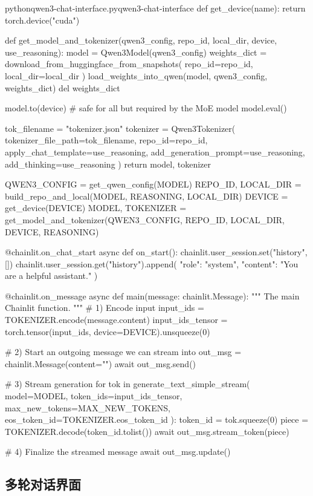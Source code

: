 \documentclass[lang=cn,newtx,10pt,scheme=chinese]{elegantbook}
\begin{document}
\begin{codebox}{python}{qwen3-chat-interface.py}{qwen3-chat-interface}
def get_device(name):
    return torch.device("cuda")

def get_model_and_tokenizer(qwen3_config, repo_id, local_dir, device, use_reasoning):
    model = Qwen3Model(qwen3_config)
    weights_dict = download_from_huggingface_from_snapshots(
        repo_id=repo_id,
        local_dir=local_dir
    )
    load_weights_into_qwen(model, qwen3_config, weights_dict)
    del weights_dict

    model.to(device)  # safe for all but required by the MoE model
    model.eval()

    tok_filename = "tokenizer.json"
    tokenizer = Qwen3Tokenizer(
        tokenizer_file_path=tok_filename,
        repo_id=repo_id,
        apply_chat_template=use_reasoning,
        add_generation_prompt=use_reasoning,
        add_thinking=use_reasoning
    )
    return model, tokenizer


QWEN3_CONFIG = get_qwen_config(MODEL)
REPO_ID, LOCAL_DIR = build_repo_and_local(MODEL, REASONING, LOCAL_DIR)
DEVICE = get_device(DEVICE)
MODEL, TOKENIZER = get_model_and_tokenizer(QWEN3_CONFIG, REPO_ID, LOCAL_DIR, DEVICE, REASONING)


@chainlit.on_chat_start
async def on_start():
    chainlit.user_session.set("history", [])
    chainlit.user_session.get("history").append(
        {"role": "system", "content": "You are a helpful assistant."}
    )


@chainlit.on_message
async def main(message: chainlit.Message):
    """
    The main Chainlit function.
    """
    # 1) Encode input
    input_ids = TOKENIZER.encode(message.content)
    input_ids_tensor = torch.tensor(input_ids, device=DEVICE).unsqueeze(0)

    # 2) Start an outgoing message we can stream into
    out_msg = chainlit.Message(content="")
    await out_msg.send()

    # 3) Stream generation
    for tok in generate_text_simple_stream(
        model=MODEL,
        token_ids=input_ids_tensor,
        max_new_tokens=MAX_NEW_TOKENS,
        eos_token_id=TOKENIZER.eos_token_id
    ):
        token_id = tok.squeeze(0)
        piece = TOKENIZER.decode(token_id.tolist())
        await out_msg.stream_token(piece)

    # 4) Finalize the streamed message
    await out_msg.update()
\end{codebox}

\subsection{多轮对话界面}
\end{document}
